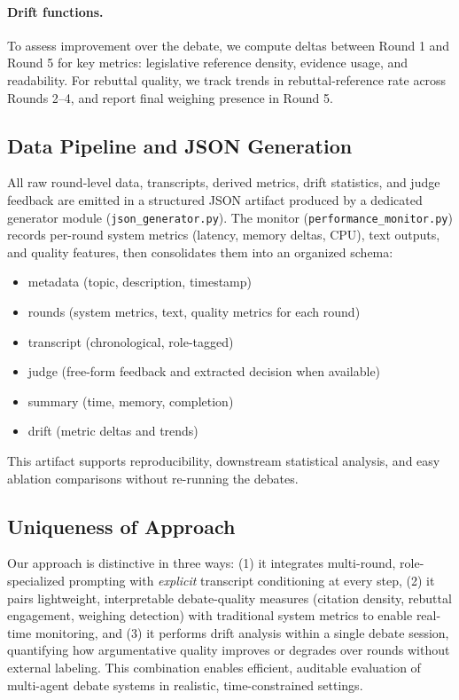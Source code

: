 \documentclass{article}
\begin{document}
\paragraph{Drift functions.} To assess improvement over the debate, we compute deltas between Round 1 and Round 5 for key metrics: legislative reference density, evidence usage, and readability. For rebuttal quality, we track trends in rebuttal-reference rate across Rounds 2--4, and report final weighing presence in Round 5.

\subsection{Data Pipeline and JSON Generation}

All raw round-level data, transcripts, derived metrics, drift statistics, and judge feedback are emitted in a structured JSON artifact produced by a dedicated generator module (\texttt{json\_generator.py}). The monitor (\texttt{performance\_monitor.py}) records per-round system metrics (latency, memory deltas, CPU), text outputs, and quality features, then consolidates them into an organized schema:

\begin{itemize}
    \item metadata (topic, description, timestamp)
    \item rounds (system metrics, text, quality metrics for each round)
    \item transcript (chronological, role-tagged)
    \item judge (free-form feedback and extracted decision when available)
    \item summary (time, memory, completion)
    \item drift (metric deltas and trends)
\end{itemize}

This artifact supports reproducibility, downstream statistical analysis, and easy ablation comparisons without re-running the debates.

\subsection{Uniqueness of Approach}

Our approach is distinctive in three ways: (1) it integrates multi-round, role-specialized prompting with \emph{explicit} transcript conditioning at every step, (2) it pairs lightweight, interpretable debate-quality measures (citation density, rebuttal engagement, weighing detection) with traditional system metrics to enable real-time monitoring, and (3) it performs drift analysis within a single debate session, quantifying how argumentative quality improves or degrades over rounds without external labeling. This combination enables efficient, auditable evaluation of multi-agent debate systems in realistic, time-constrained settings.
\end{document}
